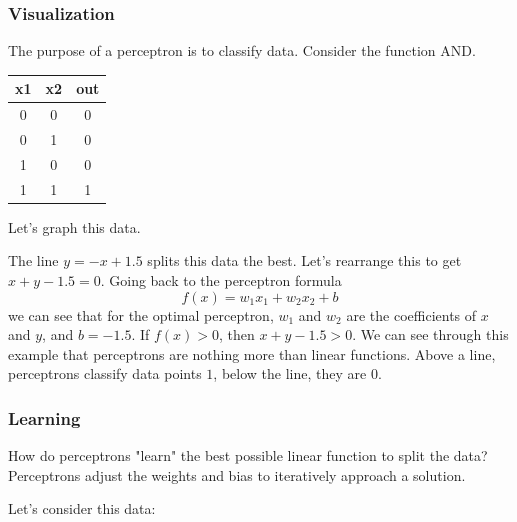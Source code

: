 \subsubsection{Visualization}

The purpose of a perceptron is to classify data. Consider the function AND.
\begin{center}
	\begin{tabular}{ |c|c|c| } 
		\hline
		x1 & x2 & out \\
		\hline
		0 & 0 & 0 \\ 
		0 & 1 & 0 \\ 
		1 & 0 & 0 \\ 
		1 & 1 & 1 \\ 
		\hline
	\end{tabular}
\end{center}
Let's graph this data.
\begin{center}
\end{center}

The line $y = -x + 1.5$ splits this data the best.
Let's rearrange this to get $x + y - 1.5 = 0$. 
Going back to the perceptron formula
\[f(x) = w_1x_1 + w_2x_2 + b\]
we can see that for the optimal perceptron,  $w_1$ and $w_2$ are the coefficients of $x$ and $y$, and $b=-1.5$. If $f(x) > 0$, then $x + y - 1.5>0$. We can see through this example that perceptrons are nothing more than linear functions. Above a line, perceptrons classify data points $1$, below the line, they are $0$.

\subsubsection{Learning}

How do perceptrons "learn" the best possible linear function to split the data? Perceptrons adjust the weights and bias to iteratively approach a solution.

Let's consider this data:
\begin{center}
\end{center}

